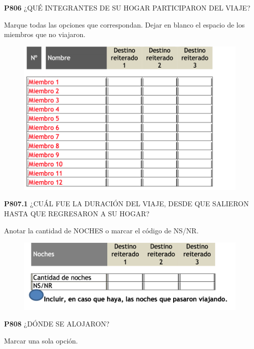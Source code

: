 \documentclass[
  openany]{book}
\begin{document}
\textbf{P806} ¿QUÉ INTEGRANTES DE SU HOGAR PARTICIPARON DEL VIAJE?

Marque todas las opciones que correspondan. Dejar en blanco el espacio de los miembros que no viajaron.

\begin{figure}

{\centering \includegraphics[width=1\linewidth]{imagenes/figura6-260} 

}

\end{figure}

\textbf{P807.1} ¿CUÁL FUE LA DURACIÓN DEL VIAJE, DESDE QUE SALIERON HASTA QUE REGRESARON A SU HOGAR?

Anotar la cantidad de NOCHES o marcar el código de NS/NR.

\begin{figure}

{\centering \includegraphics[width=1\linewidth]{imagenes/figura6-261} 

}

\end{figure}

\textbf{P808} ¿DÓNDE SE ALOJARON?

Marcar una sola opción.
\end{document}
